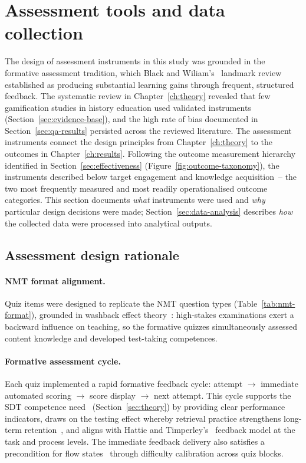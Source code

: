 \section{Assessment tools and data collection} \label{sec:assessment}

The design of assessment instruments in this study was grounded in the formative assessment tradition, which Black and Wiliam's~\cite{BlackWiliam1998} landmark review established as producing substantial learning gains through frequent, structured feedback. The systematic review in Chapter~\ref{ch:theory} revealed that few gamification studies in history education used validated instruments (Section~\ref{sec:evidence-base}), and the high rate of bias documented in Section~\ref{sec:qa-results} persisted across the reviewed literature. The assessment instruments connect the design principles from Chapter~\ref{ch:theory} to the outcomes in Chapter~\ref{ch:results}. Following the outcome measurement hierarchy identified in Section~\ref{sec:effectiveness} (Figure~\ref{fig:outcome-taxonomy}), the instruments described below target engagement and knowledge acquisition~-- the two most frequently measured and most readily operationalised outcome categories. This section documents \emph{what} instruments were used and \emph{why} particular design decisions were made; Section~\ref{sec:data-analysis} describes \emph{how} the collected data were processed into analytical outputs.

\subsection{Assessment design rationale} \label{sec:assessment-rationale}

\paragraph{NMT format alignment.}
Quiz items were designed to replicate the NMT question types (Table~\ref{tab:nmt-format}), grounded in washback effect theory~\cite{AldersonWall1993}: high-stakes examinations exert a backward influence on teaching, so the formative quizzes simultaneously assessed content knowledge and developed test-taking competences.

\paragraph{Formative assessment cycle.}
Each quiz implemented a rapid formative feedback cycle: attempt $\to$ immediate automated scoring $\to$ score display $\to$ next attempt. This cycle supports the SDT competence need~\cite{RyanDeci2000} (Section~\ref{sec:theory}) by providing clear performance indicators, draws on the testing effect whereby retrieval practice strengthens long-term retention~\cite{RoedigerButler2011, Dunlosky2013}, and aligns with Hattie and Timperley's~\cite{HattieTimperley2007} feedback model at the task and process levels. The immediate feedback delivery also satisfies a precondition for flow states~\cite{Csikszentmihalyi1990} through difficulty calibration across quiz blocks.

